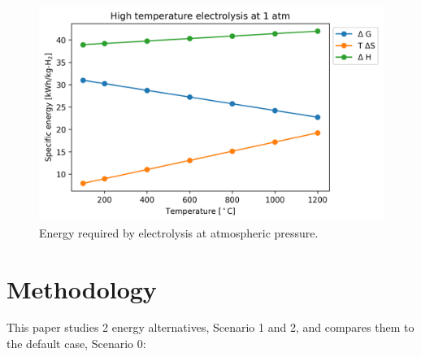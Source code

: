 \documentclass{anstrans}
\begin{document}
\begin{figure}[htbp!] %
    \centering
    \includegraphics[width=0.90\linewidth]{figures/hte-energy}
    \hfill
    \caption{Energy required by electrolysis at atmospheric pressure.}
    \label{fig:hte-energy}
\end{figure}


\section{Methodology}



This paper studies 2 energy alternatives, Scenario 1 and 2, and compares them to the default case, Scenario 0:
\end{document}
